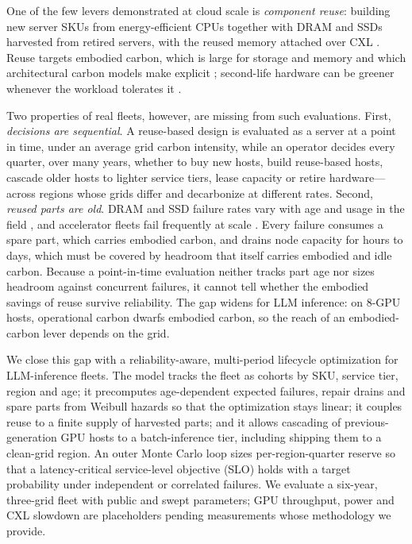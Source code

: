 \documentclass[11pt]{article}
\begin{document}
One of the few levers demonstrated at cloud scale is \emph{component reuse}: building new server SKUs from energy-efficient CPUs together with DRAM and SSDs harvested from retired servers, with the reused memory attached over CXL \citep{wang2024greensku}. Reuse targets embodied carbon, which is large for storage and memory \citep{tannu2023ssd} and which architectural carbon models make explicit \citep{gupta2022act}; second-life hardware can be greener whenever the workload tolerates it \citep{switzer2023junkyard}.

Two properties of real fleets, however, are missing from such evaluations. First, \emph{decisions are sequential}. A reuse-based design is evaluated as a server at a point in time, under an average grid carbon intensity, while an operator decides every quarter, over many years, whether to buy new hosts, build reuse-based hosts, cascade older hosts to lighter service tiers, lease capacity or retire hardware---across regions whose grids differ and decarbonize at different rates. Second, \emph{reused parts are old}. DRAM and SSD failure rates vary with age and usage in the field \citep{schroeder2009dram,meza2015dram,schroeder2016flash}, and accelerator fleets fail frequently at scale \citep{llama3,kokolis2025reliability}. Every failure consumes a spare part, which carries embodied carbon, and drains node capacity for hours to days, which must be covered by headroom that itself carries embodied and idle carbon. Because a point-in-time evaluation neither tracks part age nor sizes headroom against concurrent failures, it cannot tell whether the embodied savings of reuse survive reliability. The gap widens for LLM inference: on 8-GPU hosts, operational carbon dwarfs embodied carbon, so the reach of an embodied-carbon lever depends on the grid.

We close this gap with a reliability-aware, multi-period lifecycle optimization for LLM-inference fleets. The model tracks the fleet as cohorts by SKU, service tier, region and age; it precomputes age-dependent expected failures, repair drains and spare parts from Weibull hazards so that the optimization stays linear; it couples reuse to a finite supply of harvested parts; and it allows cascading of previous-generation GPU hosts to a batch-inference tier, including shipping them to a clean-grid region. An outer Monte Carlo loop sizes per-region-quarter reserve so that a latency-critical service-level objective (SLO) holds with a target probability under independent or correlated failures. We evaluate a six-year, three-grid fleet with public and swept parameters; GPU throughput, power and CXL slowdown are placeholders pending measurements whose methodology we provide.
\end{document}
